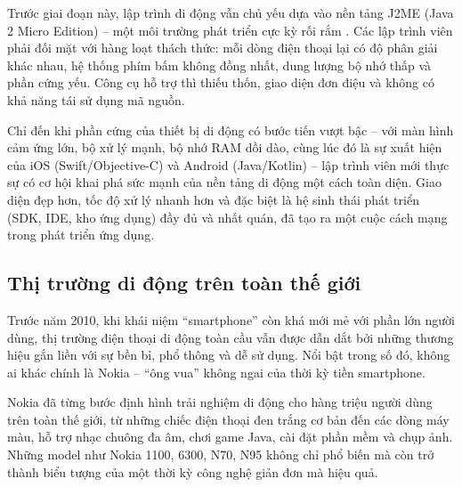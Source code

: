 \vspace{0.5em}

\hspace*{0.8cm}Trước giai đoạn này, lập trình di động vẫn chủ yếu dựa vào nền tảng J2ME (Java 2 Micro Edition) – một môi trường phát triển cực kỳ rối rắm \cite{j2me-limitations}. Các lập trình viên phải đối mặt với hàng loạt thách thức: mỗi dòng điện thoại lại có độ phân giải khác nhau, hệ thống phím bấm không đồng nhất, dung lượng bộ nhớ thấp và phần cứng yếu. Công cụ hỗ trợ thì thiếu thốn, giao diện đơn điệu và không có khả năng tái sử dụng mã nguồn.

\vspace{0.5em}

\hspace*{0.8cm}Chỉ đến khi phần cứng của thiết bị di động có bước tiến vượt bậc – với màn hình cảm ứng lớn, bộ xử lý mạnh, bộ nhớ RAM dồi dào, cùng lúc đó là sự xuất hiện của iOS (Swift/Objective-C) và Android (Java/Kotlin) – lập trình viên mới thực sự có cơ hội khai phá sức mạnh của nền tảng di động một cách toàn diện. Giao diện đẹp hơn, tốc độ xử lý nhanh hơn và đặc biệt là hệ sinh thái phát triển (SDK, IDE, kho ứng dụng) đầy đủ và nhất quán, đã tạo ra một cuộc cách mạng trong phát triển ứng dụng.


\subsection{Thị trường di động trên toàn thế giới}
\renewcommand{\labelitemi}{--}    

  \hspace*{0.8cm}Trước năm 2010, khi khái niệm “smartphone” còn khá mới mẻ với phần lớn người dùng, thị trường điện thoại di động toàn cầu vẫn được dẫn dắt bởi những thương hiệu gắn liền với sự bền bỉ, phổ thông và dễ sử dụng. Nổi bật trong số đó, không ai khác chính là Nokia – “ông vua” không ngai của thời kỳ tiền smartphone.
  
  \vspace{0.5em}
  
  \hspace*{0.8cm}Nokia đã từng bước định hình trải nghiệm di động cho hàng triệu người dùng trên toàn thế giới, từ những chiếc điện thoại đen trắng cơ bản đến các dòng máy màu, hỗ trợ nhạc chuông đa âm, chơi game Java, cài đặt phần mềm và chụp ảnh. Những model như Nokia 1100, 6300, N70, N95 không chỉ phổ biến mà còn trở thành biểu tượng của một thời kỳ công nghệ giản đơn mà hiệu quả.
  
  \vspace{0.5em}
  
